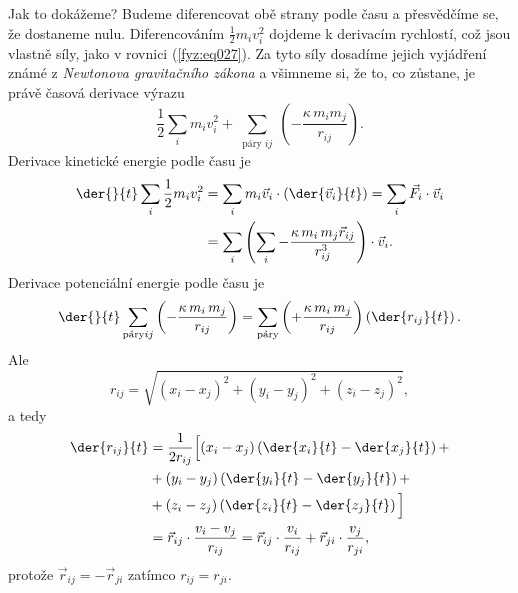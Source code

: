    Jak to dokážeme? Budeme diferencovat obě strany podle času a přesvědčíme se, že dostaneme nulu. 
    Diferencováním \(\frac{1}{2}m_iv_i^2\) dojdeme k derivacím rychlostí, což jsou vlastně síly, 
    jako v rovnici (\ref{fyz:eq027}). Za tyto síly dosadíme jejich vyjádření známé z 
    \emph{Newtonova gravitačního zákona} a všimneme si, že to, co zůstane, je právě časová derivace 
    výrazu
    \begin{equation*}
      \frac{1}{2}\sum_im_iv_i^2 + 
      \sum_{\substack{\text{páry } ij}}\left(-\frac{\kappa\,m_im_j}{r_{ij}}\right).
    \end{equation*}
    Derivace kinetické energie podle času je
    \begin{align}
      \der{ }{t}\sum_{\substack{i}}\frac{1}{2}m_iv_i^2 &=
                \sum_{\substack{i}}m_i\vec{v}_i\cdot\left(\der{\vec{v}_i}{t}\right)  
              = \sum_{\substack{i}}\vec{F}_i\cdot\vec{v}_i                           \nonumber \\
             &= \sum_{\substack{i}}\left(\sum_{\substack{i}}
               -\frac{\kappa\,m_i\,m_j\vec{r}_{ij}}{r_{ij}^3}\right)\cdot\vec{v}_i.  
                \label{fyz:eq040}
    \end{align}
    Derivace potenciální energie podle času je
    \begin{equation}\label{fyz:eq041}
      \der{ }{t}\sum_{\substack{\text{páry}} ij}\left(-\frac{\kappa\,m_i\,m_j}{r_{ij}}\right) =
                \sum_{\substack{\text{páry}}}\left(+\frac{\kappa\,m_i\,m_j}{r_{ij}}\right)
                     \left(\der{r_{ij}}{t}\right).
    \end{equation}
    Ale
    \begin{equation}\label{fyz:eq042}
      r_{ij} = \sqrt{(x_i - x_j)^2 + (y_i - y_j)^2 + (z_i - z_j)^2},
    \end{equation}
    a tedy
    \begin{align*}
      \der{r_{ij}}{t} 
        &= \frac{1}{2r_{ij}}
        \Big[\Big.
           (x_i - x_j)\left(\der{x_i}{t} - \der{x_j}{t}\right) +   \\ 
        &+ (y_i - y_j)\left(\der{y_i}{t} - \der{y_j}{t}\right) +   \\
        &+ (z_i - z_j)\left(\der{z_i}{t} - \der{z_j}{t}\right)    
        \Big.\Big]                                                 \\
        &= \vec{r}_{ij}\cdot\frac{v_i - v_j}{r_{ij}} 
         = \vec{r}_{ij}\cdot\frac{v_i}{r_{ij}} + \vec{r}_{ji}\cdot\frac{v_j}{r_{ji}},
    \end{align*}
    protože \(\vec{r}_{ij} = - \vec{r}_{ji}\) zatímco \(r_{ij} = r_{ji}\).
    
